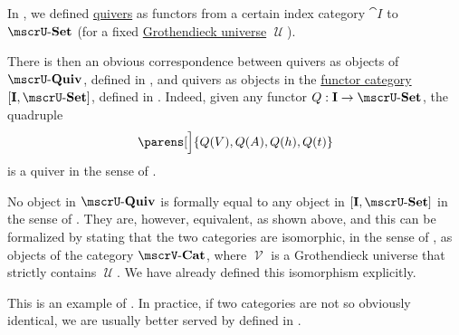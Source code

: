 \begin{example}\label{ex:isomorphism_of_categories}
  In , we defined \hyperref[def:quiver]{quivers} as functors from a certain index category \( \cat{I} \) to \( \ucat{Set} \) (for a fixed \hyperref[def:grothendieck_universe]{Grothendieck universe} \( \mscrU \)).

  There is then an obvious correspondence between quivers as objects of \hyperref[def:category_of_small_quivers]{\( \ucat{Quiv} \)}, defined in , and quivers as objects in the \hyperref[def:functor_category]{functor category} \( [\cat{I}, \ucat{Set}] \), defined in . Indeed, given any functor \( Q: \cat{I} \to \ucat{Set} \), the quadruple
  \begin{equation*}
    \parens[\Big]{ Q(V), Q(A), Q(h), Q(t) }
  \end{equation*}
  is a quiver in the sense of .

  No object in \( \ucat{Quiv} \) is formally equal to any object in \( [\cat{I}, \ucat{Set}] \) in the sense of \hyperref[def:zfc]{}. They are, however, equivalent, as shown above, and this can be formalized by stating that the two categories are isomorphic, in the sense of , as objects of the category \( \ucat[\mscrV]{Cat} \), where \( \mscrV \) is a Grothendieck universe that strictly contains \( \mscrU \). We have already defined this isomorphism explicitly.

  This is an example of . In practice, if two categories are not so obviously identical, we are usually better served by  defined in .
\end{example}

